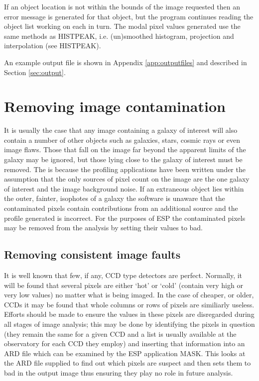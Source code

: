 \documentclass[twoside,11pt]{starlink}
\begin{document}
If an object location
is not within the bounds of the image requested then an
error message is generated for that object, but the program continues
reading the object list working on each in turn. The modal pixel values
generated use the same methods as HISTPEAK, i.e. (un)smoothed histogram,
projection and interpolation (see HISTPEAK).

An example output file is shown in
Appendix \ref{app:outputfiles}
and described in
Section \ref{sec:output}.


\section{Removing image contamination}
\label{sec:removi}

It is usually the case that any image containing a galaxy of interest will
also contain a number of other objects such as galaxies, stars, cosmic rays
or even image flaws.
Those that fall on the image far beyond the apparent limits of the
galaxy may be ignored, but those lying close
to the galaxy of interest must be
removed. The is because the profiling applications have been
written under the assumption that the only sources of pixel count
on the image are the one galaxy of interest and the image background noise.
If an extraneous object lies within the outer, fainter, isophotes of a galaxy
the software is unaware that the contaminated pixels contain
contributions from an additional source and the profile generated is incorrect.
For the purposes of ESP the contaminated pixels may be removed from the
analysis by setting their values to bad.

\subsection{Removing consistent image faults}

It is well known that few, if any, CCD type detectors are perfect. Normally,
it will be found that several pixels are either `hot' or `cold' (contain very
high or very low values) no matter what is being imaged. In the case of
cheaper, or older, CCDs it may be found that whole columns or rows of pixels
are similiarly useless. Efforts should be made to ensure the values in these
pixels are disregarded during all stages of image analysis; this may
be done by identifying the pixels in question (they remain the same for
a given CCD and a list is usually available at the observatory for
each CCD they employ) and inserting that information into an ARD file
which can be examined by the ESP application MASK. This looks at the
ARD file supplied to find out which pixels are suspect and then sets them
to bad in the output image thus ensuring they play no role in future analysis.
\end{document}
